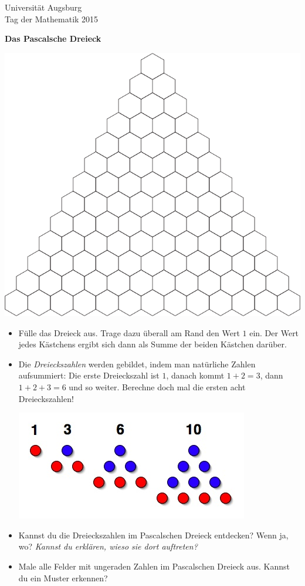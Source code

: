\documentclass[a4paper,ngerman]{scrartcl}
\newcommand{\header}{%
  \begin{raggedleft}
  \tiny Universität Augsburg \\
  Tag der Mathematik 2015 \par
  \end{raggedleft}}
\begin{document}
\header

\begin{center}
  \Huge\bf
  Das Pascalsche Dreieck
\end{center}

\begin{center}
\includegraphics[scale=1.2]{pascal-triangle}
\end{center}

\renewcommand{\labelitemi}{$\triangle$}

\Large
\begin{itemize}
\item Fülle das Dreieck aus. Trage dazu überall am Rand den Wert $1$ ein. Der
Wert jedes Kästchens ergibt sich dann als Summe der beiden Kästchen darüber.
\item Die \emph{Dreieckszahlen} werden gebildet, indem man natürliche Zahlen
aufsummiert: Die erste Dreieckszahl ist $1$, danach kommt $1+2 = 3$, dann
$1+2+3 = 6$ und so weiter. Berechne doch mal die ersten acht Dreieckszahlen!
\begin{center}
\includegraphics[scale=0.5]{triangular-numbers}
\end{center}
\item Kannst du die Dreieckszahlen im Pascalschen Dreieck entdecken? Wenn ja, wo?
\emph{Kannst du erklären, wieso sie dort auftreten?}
\item Male alle Felder mit ungeraden Zahlen im Pascalschen Dreieck aus. Kannst
du ein Muster erkennen?          
\end{itemize}
\end{document}
